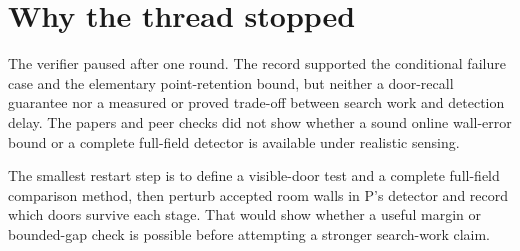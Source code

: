 \documentclass{article}
\begin{document}
\section{Why the thread stopped}

The verifier paused after one round. The record supported the conditional failure case and the
elementary point-retention bound, but neither a door-recall guarantee nor a measured or proved
trade-off between search work and detection delay. The papers and peer checks did not show whether a
sound online wall-error bound or a complete full-field detector is available under realistic
sensing.

The smallest restart step is to define a visible-door test and a complete full-field comparison
method, then perturb accepted room walls in P's detector and record which doors survive each stage.
That would show whether a useful margin or bounded-gap check is possible before attempting a
stronger search-work claim.



\end{document}
